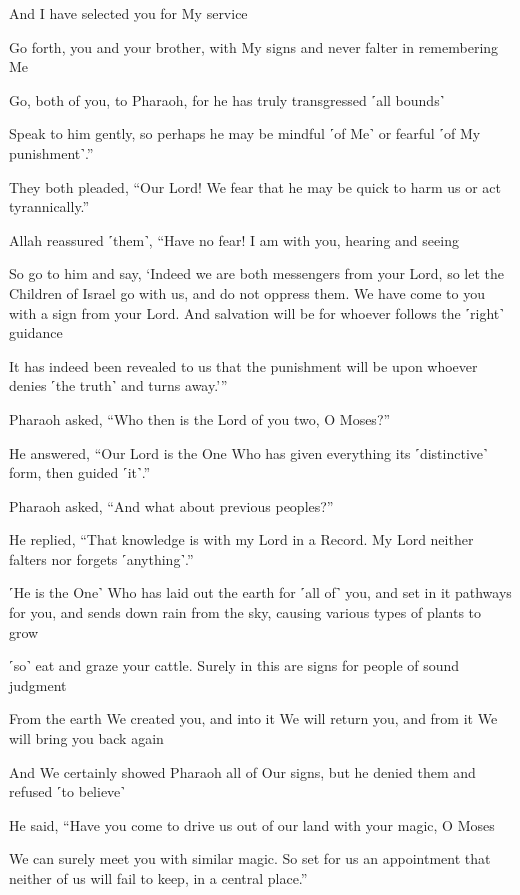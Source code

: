 And I have selected you for My service

Go forth, you and your brother, with My signs and never falter in remembering Me

Go, both of you, to Pharaoh, for he has truly transgressed ˹all bounds˺

Speak to him gently, so perhaps he may be mindful ˹of Me˺ or fearful ˹of My punishment˺.”

They both pleaded, “Our Lord! We fear that he may be quick to harm us or act tyrannically.”

Allah reassured ˹them˺, “Have no fear! I am with you, hearing and seeing

So go to him and say, ‘Indeed we are both messengers from your Lord, so let the Children of Israel go with us, and do not oppress them. We have come to you with a sign from your Lord. And salvation will be for whoever follows the ˹right˺ guidance

It has indeed been revealed to us that the punishment will be upon whoever denies ˹the truth˺ and turns away.’”

Pharaoh asked, “Who then is the Lord of you two, O Moses?”

He answered, “Our Lord is the One Who has given everything its ˹distinctive˺ form, then guided ˹it˺.”

Pharaoh asked, “And what about previous peoples?”

He replied, “That knowledge is with my Lord in a Record. My Lord neither falters nor forgets ˹anything˺.”

˹He is the One˺ Who has laid out the earth for ˹all of˺ you, and set in it pathways for you, and sends down rain from the sky, causing various types of plants to grow

˹so˺ eat and graze your cattle. Surely in this are signs for people of sound judgment

From the earth We created you, and into it We will return you, and from it We will bring you back again

And We certainly showed Pharaoh all of Our signs, but he denied them and refused ˹to believe˺

He said, “Have you come to drive us out of our land with your magic, O Moses

We can surely meet you with similar magic. So set for us an appointment that neither of us will fail to keep, in a central place.”

